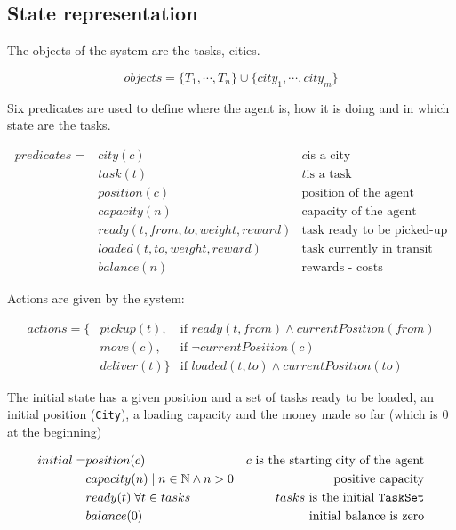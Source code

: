 \documentclass[11pt,a4paper]{article}
\begin{document}
\newpage
\subsection*{State representation}

The objects of the system are the tasks, cities.

$$ objects = \{T_1, \cdots, T_n\} \cup \{city_1, \cdots, city_m\} $$

Six predicates are used to define where the agent is, how it is doing and in
which state are the tasks.

\begin{align*}
predicates = &city(c)                            & c \text{is a city} \\
             &task(t)                            & t \text{is a task} \\
             &position(c)                        & \text{position of the agent}      \\
             &capacity(n)                        & \text{capacity of the agent}      \\
             &ready(t, from, to, weight, reward) & \text{task ready to be picked-up} \\
             &loaded(t, to, weight, reward)      & \text{task currently in transit}  \\
             &balance(n)                         & \text{rewards - costs}
\end{align*}

Actions are given by the system:

\begin{align*}
actions = \{&pickup(t),   & \text{if } ready(t, from) \wedge currentPosition(from) \\
            &move(c),     & \text{if } \lnot currentPosition(c)                    \\
            &deliver(t)\} & \text{if } loaded(t, to) \wedge currentPosition(to)
\end{align*}

The initial state has a given position and a set of tasks ready to be loaded,
an initial position (\texttt{City}), a loading capacity and the money made so
far (which is $0$ at the beginning)

\begin{align*}
    initial = &position(c)                            & c \text{ is the starting city of the agent} \\
              &capacity(n) \; | \; n \in \mathbb{N} \wedge n > 0   & \text{positive capacity} \\
              &ready(t) \; \forall t \in tasks                   & tasks \text{ is the initial \texttt{TaskSet}} \\
              &balance(0) & \text{initial balance is zero}
\end{align*}
\end{document}

